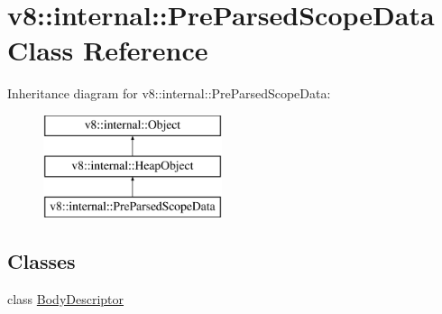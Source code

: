 \hypertarget{classv8_1_1internal_1_1PreParsedScopeData}{}\section{v8\+:\+:internal\+:\+:Pre\+Parsed\+Scope\+Data Class Reference}
\label{classv8_1_1internal_1_1PreParsedScopeData}
Inheritance diagram for v8\+:\+:internal\+:\+:Pre\+Parsed\+Scope\+Data\+:\begin{figure}[H]
\begin{center}
\leavevmode
\includegraphics[height=3.000000cm]{classv8_1_1internal_1_1PreParsedScopeData}
\end{center}
\end{figure}
\subsection*{Classes}
\begin{DoxyCompactItemize}
\item 
class \mbox{\hyperlink{classv8_1_1internal_1_1PreParsedScopeData_1_1BodyDescriptor}{Body\+Descriptor}}
\end{DoxyCompactItemize}
